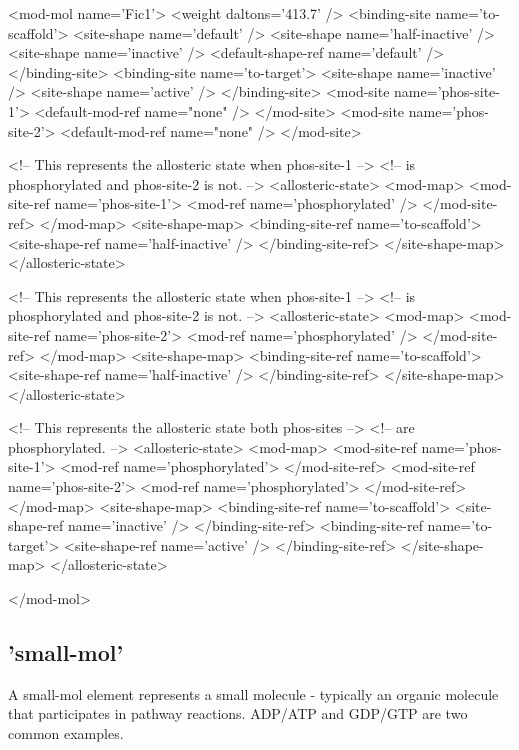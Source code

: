 \begin{ExampleXML}[caption=A complete mod-mol example, label=completemodmolexample]
<mod-mol name='Fic1'>
  <weight daltons='413.7' />
  <binding-site name='to-scaffold'>
    <site-shape name='default' />
    <site-shape name='half-inactive' />
    <site-shape name='inactive' />
    <default-shape-ref name='default' />
  </binding-site>
  <binding-site name='to-target'>
    <site-shape name='inactive' />
    <site-shape name='active' />
  </binding-site>
  <mod-site name='phos-site-1'>
    <default-mod-ref name="none" />
  </mod-site>
  <mod-site name='phos-site-2'>
    <default-mod-ref name="none" />
  </mod-site>

  <!-- This represents the allosteric state when phos-site-1 -->
  <!-- is phosphorylated and phos-site-2 is not.             -->
  <allosteric-state>
    <mod-map>
      <mod-site-ref name='phos-site-1'>
	<mod-ref name='phosphorylated' />
      </mod-site-ref>
    </mod-map>
    <site-shape-map>
      <binding-site-ref name='to-scaffold'>
	<site-shape-ref name='half-inactive' />
      </binding-site-ref>
    </site-shape-map>
  </allosteric-state>

  <!-- This represents the allosteric state when phos-site-1 -->
  <!-- is phosphorylated and phos-site-2 is not.             -->
  <allosteric-state>
    <mod-map>
      <mod-site-ref name='phos-site-2'>
	<mod-ref name='phosphorylated' />
      </mod-site-ref>
    </mod-map>
    <site-shape-map>
      <binding-site-ref name='to-scaffold'>
	<site-shape-ref name='half-inactive' />
      </binding-site-ref>
    </site-shape-map>
  </allosteric-state>

  <!-- This represents the allosteric state both phos-sites  -->
  <!-- are phosphorylated. -->
  <allosteric-state>
    <mod-map>
      <mod-site-ref name='phos-site-1'>
	<mod-ref name='phosphorylated'>
      </mod-site-ref>
      <mod-site-ref name='phos-site-2'>
	<mod-ref name='phosphorylated'>
      </mod-site-ref>
    </mod-map>
    <site-shape-map>
      <binding-site-ref name='to-scaffold'>
	<site-shape-ref name='inactive' />
      </binding-site-ref>
      <binding-site-ref name='to-target'>
	<site-shape-ref name='active' />
      </binding-site-ref>
    </site-shape-map>
  </allosteric-state>
  
</mod-mol>
\end{ExampleXML}

\subsection{'small-mol'}
A small-mol element represents a small molecule - typically an organic
molecule that participates in pathway reactions.  ADP/ATP and GDP/GTP
are two common examples.

